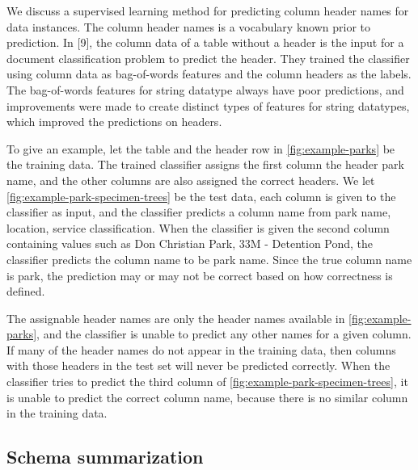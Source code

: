 We discuss a supervised learning method for predicting column header names for data instances. The column header names is a vocabulary known prior to prediction. In \cite{10.1145/3184558.3191601}[9], the column data of a table without a header is the input for a document classification problem to predict the header. They trained the classifier using column data as bag-of-words features and the column headers as the labels. The bag-of-words features for string datatype always have poor predictions, and improvements were made to create distinct types of features for string datatypes, which improved the predictions on headers.

To give an example, let the table and the header row in \autoref{fig:example-parks} be the training data. The trained classifier assigns the first column the header park name, and the other columns are also assigned the correct headers. We let \autoref{fig:example-park-specimen-trees} be the test data, each column is given to the classifier as input, and the classifier predicts a column name from {park name, location, service classification}. When the classifier is given the second column containing values such as Don Christian Park, 33M - Detention Pond, the classifier predicts the column name to be park name. Since the true column name is park, the prediction may or may not be correct based on how correctness is defined.

The assignable header names are only the header names available in \autoref{fig:example-parks}, and the classifier is unable to predict any other names for a given column. If many of the header names do not appear in the training data, then columns with those headers in the test set will never be predicted correctly. When the classifier tries to predict the third column of \autoref{fig:example-park-specimen-trees}, it is unable to predict the correct column name, because there is no similar column in the training data.

\subsection{Schema summarization}
\label{ssec:SchemaSummarization}

